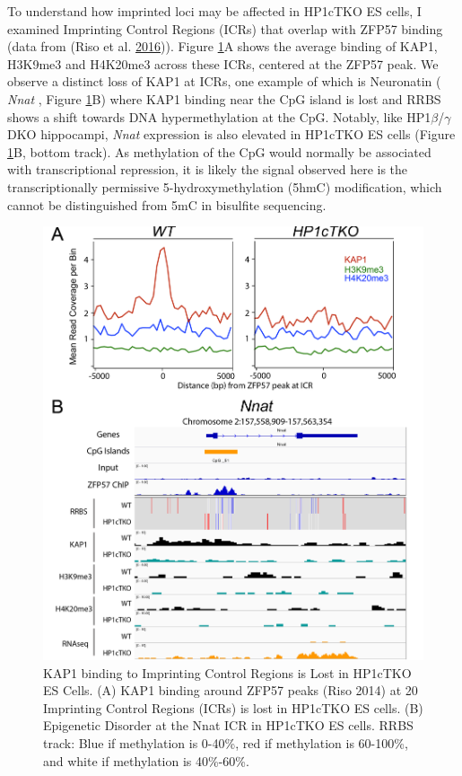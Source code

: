 \documentclass[onehalf,12pt]{beavtex}
\begin{document}
  To understand how imprinted loci may be affected in HP1cTKO ES cells, I
  examined Imprinting Control Regions (ICRs) that overlap with ZFP57
  binding (data from (Riso et al.
  \protect\hyperlink{ref-RisoZFP57maintainsparentoforiginspecific2016}{2016})).
  Figure \ref{fig:KAP1ICR}A shows the average binding of KAP1, H3K9me3 and
  H4K20me3 across these ICRs, centered at the ZFP57 peak. We observe a
  distinct loss of KAP1 at ICRs, one example of which is Neuronatin (
  \emph{Nnat} , Figure \ref{fig:KAP1ICR}B) where KAP1 binding near the CpG
  island is lost and RRBS shows a shift towards DNA hypermethylation at
  the CpG. Notably, like HP1\(\beta\)/\(\gamma\) DKO hippocampi,
  \emph{Nnat} expression is also elevated in HP1cTKO ES cells (Figure
  \ref{fig:KAP1ICR}B, bottom track). As methylation of the CpG would
  normally be associated with transcriptional repression, it is likely the
  signal observed here is the transcriptionally permissive
  5-hydroxymethylation (5hmC) modification, which cannot be distinguished
  from 5mC in bisulfite sequencing.
  
  \begin{figure}
  
  {\centering \includegraphics[width=0.75\linewidth, ]{./figure/results/KAP1_ICR_profile} 
  
  }
  
  \caption[KAP1 binding to Imprinting Control Regions is Lost in HP1cTKO ES Cells]{KAP1 binding to Imprinting Control Regions is Lost in HP1cTKO ES Cells. (A) KAP1 binding around ZFP57 peaks (Riso 2014) at 20 Imprinting Control Regions (ICRs) is lost in HP1cTKO ES cells. (B) Epigenetic Disorder at the Nnat ICR in HP1cTKO ES cells. RRBS track: Blue if methylation is 0-40\%, red if methylation is 60-100\%, and white if methylation is 40\%-60\%.}\label{fig:KAP1ICR}
  \end{figure}
  
\end{document}
